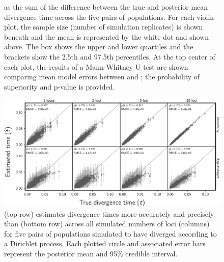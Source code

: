 \documentclass[letterpaper,12pt]{article}
\begin{document}
\begin{figure}[htbp]
\begin{center}
{            as the sum of the difference between the true and posterior mean
            divergence time across the five pairs of populations.
            For each violin plot, the sample size (number of simulation
            replicates) is shown beneath and the mean is represented by the
            white dot and shown above.
            The box shows the upper and lower quartiles and the brackets
            show the 2.5th and 97.5th percentiles.
            At the top center of each plot, the results of a Mann-Whitney U
            test \citep{MannWhitney1947} are shown comparing mean model errors
            between \ecoevolity and \dppmsbayes;
            the probability of superiority \citep[PoS, the probability that
            \ecoevolity has a lower mean model error than \dppmsbayes for a
            random simulation replicate drawn from
            each;][]{WolfeHogg1971,Grissom1994} and p-value is provided.
        }
        \label{fig:divtimeerror}
    \end{center}
\end{figure}

\begin{figure}[htbp]
    \begin{center}
        \includegraphics[width=\textwidth,height=\textheight,keepaspectratio]{../images/from-project-repo/plots/free-div-time-scatter-cropped.pdf}
        \caption{
            \Ecoevolity (top row) estimates divergence times more accurately
            and precisely than \dppmsbayes (bottom row) across all simulated
            numbers of loci (columns) for five pairs of populations simulated
            to have diverged according to a Dirichlet process.
            Each plotted circle and associated error bars represent the posterior mean
            and 95\% credible interval.
            \accuracyscatterplotannotations{\comparisonetime{}}
        }
        \label{fig:divtimescatterdp}
    \end{center}
\end{figure}
\end{document}
